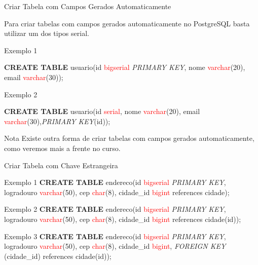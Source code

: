 \documentclass[xcolor=x11names,compress]{beamer}
\begin{document}
\begin{frame}[allowframebreaks]{Criar Tabela com Campos Gerados Automaticamente}

Para criar tabelas com campos gerados automaticamente no PostgreSQL basta utilizar um dos tipos serial.

\begin{alertblock}{Exemplo 1}

\textbf{CREATE TABLE} usuario(id \textcolor{red}{bigserial} \textit{PRIMARY KEY}, nome \textcolor{red}{varchar}(20), email \textcolor{red}{varchar}(30));

\end{alertblock}

\begin{alertblock}{Exemplo 2}

\textbf{CREATE TABLE} usuario(id \textcolor{red}{serial}, nome \textcolor{red}{varchar}(20), email \textcolor{red}{varchar}(30),\textit{PRIMARY KEY}(id));

\end{alertblock}

\begin{alertblock}{\centering Nota}
\centering Existe outra forma de criar tabelas com campos gerados automaticamente, como veremos mais a frente no curso.
\end{alertblock}

\end{frame}


\begin{frame}[allowframebreaks]{Criar Tabela com Chave Estrangeira}

\begin{alertblock}{Exemplo 1}
\textbf{CREATE TABLE} endereco(id \textcolor{red}{bigserial} \textit{PRIMARY KEY}, logradouro \textcolor{red}{varchar}(50), cep \textcolor{red}{char}(8), cidade\_id \textcolor{red}{bigint} references cidade);
\end{alertblock}

\begin{alertblock}{Exemplo 2}
\textbf{CREATE TABLE} endereco(id \textcolor{red}{bigserial} \textit{PRIMARY KEY}, logradouro \textcolor{red}{varchar}(50), cep \textcolor{red}{char}(8), cidade\_id \textcolor{red}{bigint} references cidade(id));
\end{alertblock}

\begin{alertblock}{Exemplo 3}
\textbf{CREATE TABLE} endereco(id \textcolor{red}{bigserial} \textit{PRIMARY KEY}, logradouro \textcolor{red}{varchar}(50), cep \textcolor{red}{char}(8), cidade\_id \textcolor{red}{bigint}, \textit{FOREIGN KEY} (cidade\_id) references cidade(id));
\end{alertblock}

\end{frame}
\end{document}
